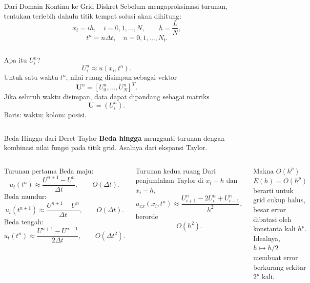 \documentclass[aspectratio=169,10pt]{beamer}
\begin{document}
\begin{frame}{Dari Domain Kontinu ke Grid Diskret}
\footnotesize
Sebelum mengaproksimasi turunan, tentukan terlebih dahulu titik tempat solusi akan dihitung:
\[
x_i=ih,\quad i=0,1,\dots,N,\qquad
h=\frac{L}{N},
\]
\[
t^n=n\Delta t,\quad n=0,1,\dots,N_t.
\]
\begin{columns}[T,onlytextwidth]
\centering
{}
\begin{block}{Apa itu $U_i^n$?}
\[
\boxed{U_i^n\approx u(x_i,t^n)}.
\]
Untuk satu waktu $t^n$, nilai ruang disimpan sebagai vektor
\[
\mathbf U^n=[U_0^n,\dots,U_N^n]^T.
\]
Jika seluruh waktu disimpan, data dapat dipandang sebagai matriks
\[
\mathbf U=(U_i^n).
\]
Baris: waktu; kolom: posisi.
\end{block}
\end{columns}
\end{frame}

\begin{frame}{Beda Hingga dari Deret Taylor}
\footnotesize
\textbf{Beda hingga} mengganti turunan dengan kombinasi nilai fungsi pada titik grid. Asalnya dari ekspansi Taylor.
\begin{columns}[T,onlytextwidth]
\begin{block}{Turunan pertama}
Beda maju:
\[
u_t(t^n)\approx\frac{U^{n+1}-U^n}{\Delta t},
\qquad O(\Delta t).
\]
Beda mundur:
\[
u_t(t^{n+1})\approx\frac{U^{n+1}-U^n}{\Delta t},
\qquad O(\Delta t).
\]
Beda tengah:
\[
u_t(t^n)\approx\frac{U^{n+1}-U^{n-1}}{2\Delta t},
\qquad O(\Delta t^2).
\]
\end{block}
\begin{block}{Turunan kedua ruang}
Dari penjumlahan Taylor di $x_i+h$ dan $x_i-h$,
\[
\boxed{u_{xx}(x_i,t^n)\approx
\frac{U_{i+1}^n-2U_i^n+U_{i-1}^n}{h^2}},
\]
berorde
\[
O(h^2).
\]
\end{block}
\begin{block}{Makna $O(h^p)$}
$E(h)=O(h^p)$ berarti untuk grid cukup halus, besar error dibatasi oleh konstanta kali $h^p$. Idealnya, $h\mapsto h/2$ membuat error berkurang sekitar $2^p$ kali.
\end{block}
\end{columns}
\end{frame}
\end{document}

